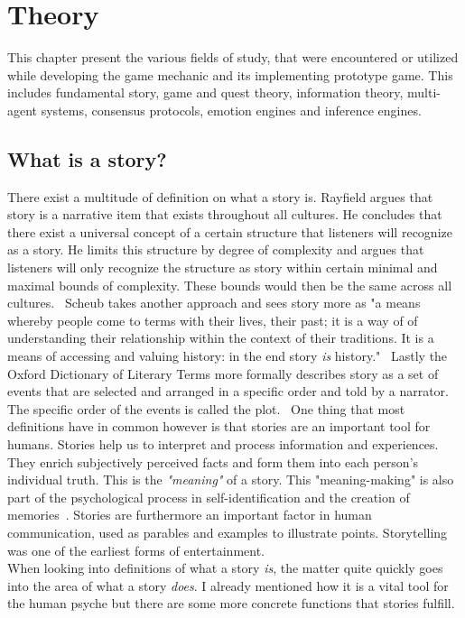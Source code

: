 \chapter{Theory} %
This chapter present the various fields of study, that were encountered or utilized while developing the game mechanic and its implementing prototype game. This includes fundamental story, game and quest theory, information theory, multi-agent systems, consensus protocols, emotion engines and inference engines.

\section{What is a story?}
There exist a multitude of definition on what a story is. Rayfield argues that story is a narrative item that exists throughout all cultures. He concludes that there exist a universal concept of a certain structure that listeners will recognize as a story. He limits this structure by degree of complexity and argues that listeners will only recognize the structure as story within certain minimal and maximal bounds of complexity. These bounds would then be the same across all cultures.~\cite{Rayfield1972} Scheub takes another approach and sees story more as "a means whereby people come to terms with their lives, their past; it is a way of of understanding their relationship within the context of their traditions. It is a means of accessing and valuing history: in the end story \textit{is} history."~\cite{Scheub1998} Lastly the Oxford Dictionary of Literary Terms more formally describes story as a set of events that are selected and arranged in a specific order and told by a narrator. The specific order of the events is called the plot.~\cite{Baldick1996} One thing that most definitions have in common however is that stories are an important tool for humans. Stories help us to interpret and process information and experiences. They enrich subjectively perceived facts and form them into each person's individual truth. This is the \textit{"meaning"} of a story. This "meaning-making" is also part of the psychological process in self-identification and the creation of memories~\cite{Flanagan1992}. Stories are furthermore an important factor in human communication, used as parables and examples to illustrate points. Storytelling was one of the earliest forms of entertainment.\\
When looking into definitions of what a story \textit{is}, the matter quite quickly goes into the area of what a story \textit{does}. I already mentioned how it is a vital tool for the human psyche but there are some more concrete functions that stories fulfill.

